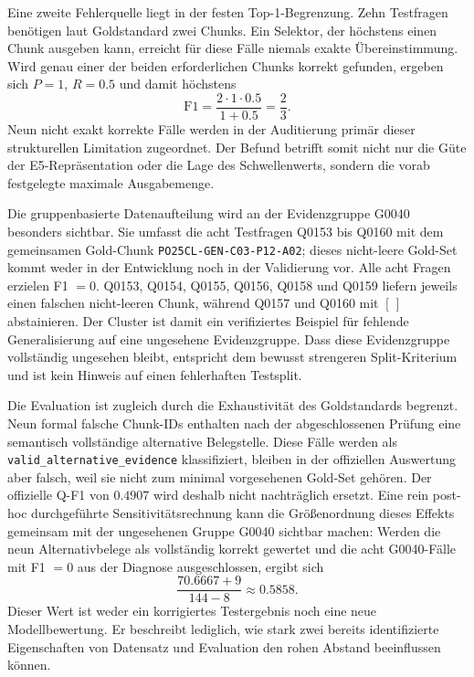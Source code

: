 \documentclass[11pt]{article}
\begin{document}
Eine zweite Fehlerquelle liegt in der festen Top-1-Begrenzung. Zehn Testfragen benötigen laut Goldstandard zwei Chunks. Ein Selektor, der höchstens einen Chunk ausgeben kann, erreicht für diese Fälle niemals exakte Übereinstimmung. Wird genau einer der beiden erforderlichen Chunks korrekt gefunden, ergeben sich $P=1$, $R=0.5$ und damit höchstens
\begin{equation}
\mathrm{F1}=\frac{2\cdot1\cdot0.5}{1+0.5}=\frac{2}{3}.
\end{equation}
Neun nicht exakt korrekte Fälle werden in der Auditierung primär dieser strukturellen Limitation zugeordnet. Der Befund betrifft somit nicht nur die Güte der E5-Repräsentation oder die Lage des Schwellenwerts, sondern die vorab festgelegte maximale Ausgabemenge.

Die gruppenbasierte Datenaufteilung wird an der Evidenzgruppe G0040 besonders sichtbar. Sie umfasst die acht Testfragen Q0153 bis Q0160 mit dem gemeinsamen Gold-Chunk \texttt{PO25CL-GEN-C03-P12-A02}; dieses nicht-leere Gold-Set kommt weder in der Entwicklung noch in der Validierung vor. Alle acht Fragen erzielen F1 $=0$. Q0153, Q0154, Q0155, Q0156, Q0158 und Q0159 liefern jeweils einen falschen nicht-leeren Chunk, während Q0157 und Q0160 mit $[\,]$ abstainieren. Der Cluster ist damit ein verifiziertes Beispiel für fehlende Generalisierung auf eine ungesehene Evidenzgruppe. Dass diese Evidenzgruppe vollständig ungesehen bleibt, entspricht dem bewusst strengeren Split-Kriterium und ist kein Hinweis auf einen fehlerhaften Testsplit.

Die Evaluation ist zugleich durch die Exhaustivität des Goldstandards begrenzt. Neun formal falsche Chunk-IDs enthalten nach der abgeschlossenen Prüfung eine semantisch vollständige alternative Belegstelle. Diese Fälle werden als \texttt{valid\_alternative\_evidence} klassifiziert, bleiben in der offiziellen Auswertung aber falsch, weil sie nicht zum minimal vorgesehenen Gold-Set gehören. Der offizielle Q-F1 von $0.4907$ wird deshalb nicht nachträglich ersetzt. Eine rein post-hoc durchgeführte Sensitivitätsrechnung kann die Größenordnung dieses Effekts gemeinsam mit der ungesehenen Gruppe G0040 sichtbar machen: Werden die neun Alternativbelege als vollständig korrekt gewertet und die acht G0040-Fälle mit F1 $=0$ aus der Diagnose ausgeschlossen, ergibt sich
\begin{equation}
\frac{70.6667+9}{144-8}\approx0.5858.
\end{equation}
Dieser Wert ist weder ein korrigiertes Testergebnis noch eine neue Modellbewertung. Er beschreibt lediglich, wie stark zwei bereits identifizierte Eigenschaften von Datensatz und Evaluation den rohen Abstand beeinflussen können.
\end{document}
